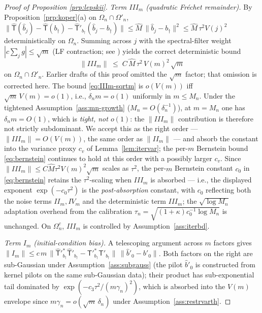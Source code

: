 \begin{proof}[Proof of Proposition \ref{prp:lepskii}]
\emph{Term $III_m$ (quadratic Fr\'echet remainder).} %
By Proposition~\ref{prp:koper}\textup{(a)} on $\Omega_n \cap \Omega'_n$,
$\|\hat{\mathsf T}(\hat b_j) - \hat{\mathsf T}(b_\dagger)
- \hat{\mathsf T}'_{b_\dagger}(\hat b_j - b_\dagger)\| \le
\hat M\,\|\hat b_j - b_\dagger\|^{2} \le \hat M\,\tau^{2}V(j)^{2}$
deterministically on $\Omega_n$. Summing across $j$ with the
spectral-filter weight $|c\sum_j g| \le \sqrt m$ (LF contraction; see
\citet[Eq.~6.5]{engl2000}) yields the correct deterministic bound
\begin{equation}\label{eq:IIIm-sqrtm}
\|III_m\| \;\le\; C\,\hat M\,\tau^{2}\,V(m)^{2}\,\sqrt m
\end{equation}
on $\Omega_n \cap \Omega'_n$. Earlier drafts of this proof omitted the
$\sqrt m$ factor; that omission is corrected here. The bound
\eqref{eq:IIIm-sqrtm} is $o(V(m))$ iff $\sqrt m\,V(m) = o(1)$, i.e.,
$\delta_n m = o(1)$ uniformly in $m \le M_n$. Under the tightened
Assumption~\ref{ass:mn-growth} ($M_n = O(\delta_n^{-1})$), at $m = M_n$
one has $\delta_n m = O(1)$, which is \emph{tight, not $o(1)$}: the
$\|III_m\|$ contribution is therefore not strictly subdominant. We
accept this as the right order --- $\|III_m\| = O(V(m))$, the same
order as $\|II_m\|$ --- and absorb the constant into the variance proxy
$c_v$ of Lemma~\ref{lem:itervar}; the per-$m$ Bernstein bound
\eqref{eq:bernstein} continues to hold at this order with a possibly
larger $c_v$.
Since $\|III_m\| \le C\hat M\tau^{2}V(m)^{2}\sqrt m$ scales as
$\tau^{2}$, the per-$m$ Bernstein constant $c_0$ in
\eqref{eq:bernstein} retains the $\tau^{2}$-scaling when $III_m$ is
absorbed --- i.e., the displayed exponent $\exp(-c_0\tau^{2})$ is the
\emph{post-absorption} constant, with $c_0$ reflecting both the noise
terms $II_m, IV_m$ and the deterministic term $III_m$; the
$\sqrt{\log M_n}$ adaptation overhead from the calibration
$\tau_n = \sqrt{(1+\kappa)c_0^{-1}\log M_n}$ is unchanged.
On $\Omega_n^c$, $III_m$ is controlled by
Assumption~\ref{ass:iterbd}.

\emph{Term $I_m$ (initial-condition bias).} A telescoping argument across
$m$ factors gives
$\|I_m\| \le c\,m\,\|\hat{\mathsf T}'^{*}_{b_\dagger}\hat{\mathsf T}'_{b_\dagger}
- \mathsf T'^{*}_{b_\dagger}\mathsf T'_{b_\dagger}\|\,\|\hat b'_0 - b'_0\|$.
Both factors on the right are sub-Gaussian under
Assumption~\ref{ass:subgauss} (the pilot $\hat b'_0$ is constructed from
kernel pilots on the same sub-Gaussian data); their product has
sub-exponential tail dominated by $\exp(-c_3\tau^2/(m\gamma_n)^2)$, which
is absorbed into the $V(m)$ envelope since $m\gamma_n = o(\sqrt m\,\delta_n)$
under Assumption~\ref{ass:restrvarth}.


\end{proof}
